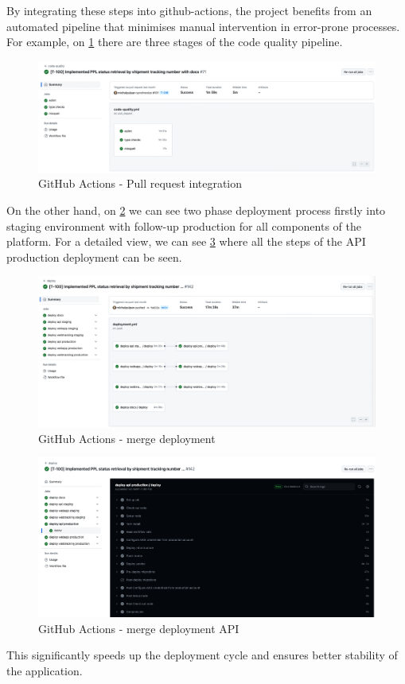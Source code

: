 By integrating these steps into \gls{github-actions}, the project benefits from an automated pipeline that minimises manual intervention in error-prone processes.
For example, on \ref{img06:fig_github_actions_integration} there are three stages of the code quality pipeline.
\begin{figure}[H]\centering
\includegraphics[width=140mm]{img/chap06/fig_github_actions_integration.png}
\caption{GitHub Actions - Pull request integration}
\label{img06:fig_github_actions_integration}
\end{figure}
On the other hand, on \ref{img06:fig_github_actions_deployment} we can see two phase deployment process firstly into staging environment with follow-up production for all components of the platform. For a detailed view, we can see \ref{img06:fig_github_actions_api_deployment} where all the steps of the API production deployment can be seen.

\begin{figure}[H]\centering
\includegraphics[width=140mm]{img/chap06/fig_github_actions_deployment.png}
\caption{GitHub Actions - merge deployment}
\label{img06:fig_github_actions_deployment}
\end{figure}
\begin{figure}[H]\centering
\includegraphics[width=140mm]{img/chap06/fig_github_actions_api_deployment.png}
\caption{GitHub Actions - merge deployment API}
\label{img06:fig_github_actions_api_deployment}
\end{figure}

This significantly speeds up the deployment cycle and ensures better stability of the application.





